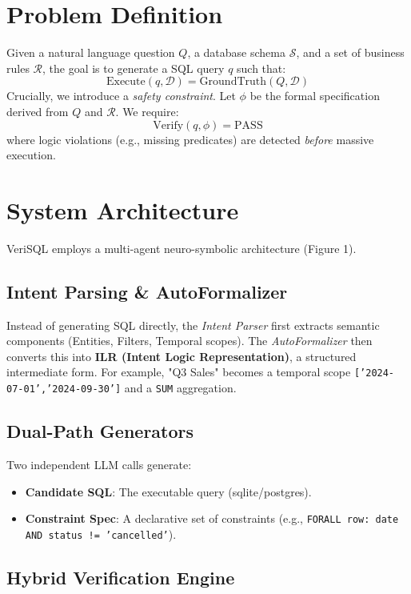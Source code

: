\documentclass[sigconf,review,anonymous]{acmart}
\begin{document}
\section{Problem Definition}

Given a natural language question $Q$, a database schema $\mathcal{S}$, and a set of business rules $\mathcal{R}$, the goal is to generate a SQL query $q$ such that:
$$ \text{Execute}(q, \mathcal{D}) = \text{GroundTruth}(Q, \mathcal{D}) $$
Crucially, we introduce a \textit{safety constraint}. Let $\phi$ be the formal specification derived from $Q$ and $\mathcal{R}$. We require:
$$ \text{Verify}(q, \phi) = \text{PASS} $$
where logic violations (e.g., missing predicates) are detected \textit{before} massive execution.

\section{System Architecture}

VeriSQL employs a multi-agent neuro-symbolic architecture (Figure 1).

\subsection{Intent Parsing \& AutoFormalizer}
Instead of generating SQL directly, the \textit{Intent Parser} first extracts semantic components (Entities, Filters, Temporal scopes). The \textit{AutoFormalizer} then converts this into \textbf{ILR (Intent Logic Representation)}, a structured intermediate form. For example, "Q3 Sales" becomes a temporal scope \texttt{['2024-07-01','2024-09-30']} and a \texttt{SUM} aggregation.

\subsection{Dual-Path Generators}
Two independent LLM calls generate:
\begin{itemize}
    \item \textbf{Candidate SQL}: The executable query (sqlite/postgres).
  \item \textbf{Constraint Spec}: A declarative set of constraints (e.g., \texttt{FORALL row: date \in [T1, T2] AND status != 'cancelled'}).
\end{itemize}

\subsection{Hybrid Verification Engine}
\end{document}
